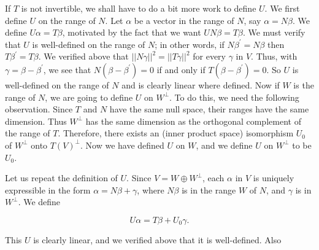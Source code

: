 If \(\mathit{T}\) is not invertible, we shall have to do a bit more work to define \(\mathit{U}\). We first define \(\mathit{U}\) on the range of \(\mathit{N}\). Let \(\alpha\) be a vector in the range of \(\mathit{N}\), say \(\alpha=\mathit{N}\beta\). We define \(\mathit{U}\alpha=\mathit{T}\beta\), motivated by the fact that we want \(\mathit{UN}\beta=\mathit{T}\beta\). We must verify that \(\mathit{U}\) is well-defined on the range of \(\mathit{N}\); in other words, if \(\mathit{N}\beta^{\prime}=\mathit{N}\beta\) then \(\mathit{T}\beta^{\prime}=\mathit{T}\beta\). We verified above that \(||\mathit{N}\gamma||^{2}=||\mathit{T}\gamma||^{2}\) for every \(\gamma\) in \(\mathit{V}\). Thus, with \(\gamma=\beta-\beta^{\prime}\), we see that \(\mathit{N}(\beta-\beta^{\prime})=0\) if and only if \(\mathit{T}(\beta-\beta^{\prime})=0\). So \(\mathit{U}\) is well-defined on the range of \(\mathit{N}\) and is clearly linear where defined. Now if \(\mathit{W}\) is the range of \(\mathit{N}\), we are going to define \(\mathit{U}\) on \(\mathit{W}^{\bot}\). To do this, we need the following observation. Since \(\mathit{T}\) and \(\mathit{N}\) have the same null space, their ranges have the same dimension. Thus \(\mathit{W}^{\bot}\) has the same dimension as the orthogonal complement of the range of \(\mathit{T}\). Therefore, there exists an (inner product space) isomorphism \(\mathit{U}_{0}\) of \(\mathit{W}^{\bot}\) onto \(\mathit{T}(\mathit{V})^{\bot}\). Now we have defined \(\mathit{U}\) on \(\mathit{W}\), and we define \(\mathit{U}\) on \(\mathit{W}^{\bot}\) to be \(\mathit{U}_{0}\).

Let us repeat the definition of \(\mathit{U}\). Since \(\mathit{V}=\mathit{W}\oplus\mathit{W}^{\bot}\), each \(\alpha\) in \(\mathit{V}\) is uniquely expressible in the form \(\alpha=\mathit{N}\beta+\gamma\), where \(\mathit{N}\beta\) is in the range \(\mathit{W}\) of \(\mathit{N}\), and \(\gamma\) is in \(\mathit{W}^{\bot}\). We define

\[\mathit{U}\alpha=\mathit{T}\beta+\mathit{U}_{0}\gamma.\]

This \(\mathit{U}\) is clearly linear, and we verified above that it is well-defined. Also